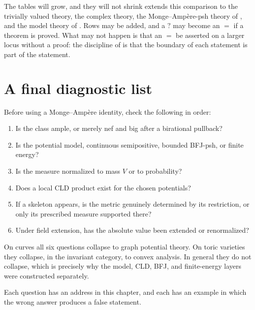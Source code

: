 \begin{warning}{The tables will grow, and they will not shrink}
 extends this comparison to the trivially
valued theory, the complex theory, the Monge--Amp\`ere-psh theory of
, and the model theory of .  Rows
may be added, and a \(?\) may become an \(=\) if a theorem is proved.  What
may not happen is that an \(=\) be asserted on a larger locus without a
proof: the discipline of  is that the boundary of
each statement is part of the statement.
\end{warning}

\section{A final diagnostic list}
\label{sec:ch31-diagnostic}

Before using a Monge--Amp\`ere identity, check the following in order:
\begin{enumerate}
\item\label{itm:ch31-diag:class} Is the class ample, or merely nef and big
      after a birational pullback?
\item\label{itm:ch31-diag:potential} Is the potential model, continuous
      semipositive, bounded BFJ-psh, or finite energy?
\item\label{itm:ch31-diag:mass} Is the measure normalized to mass \(V\) or to
      probability?
\item\label{itm:ch31-diag:cld} Does a local CLD product exist for the chosen
      potentials?
\item\label{itm:ch31-diag:skeleton} If a skeleton appears, is the metric
      genuinely determined by its restriction, or only its prescribed measure
      supported there?
\item\label{itm:ch31-diag:field} Under field extension, has the absolute
      value been extended or renormalized?
\end{enumerate}

On curves all six questions collapse to graph potential theory.  On toric
varieties they collapse, in the invariant category, to convex analysis.  In
general they do not collapse, which is precisely why the model, CLD, BFJ,
and finite-energy layers were constructed separately.

Each question has an address in this chapter, and each has an example in
which the wrong answer produces a false statement.

